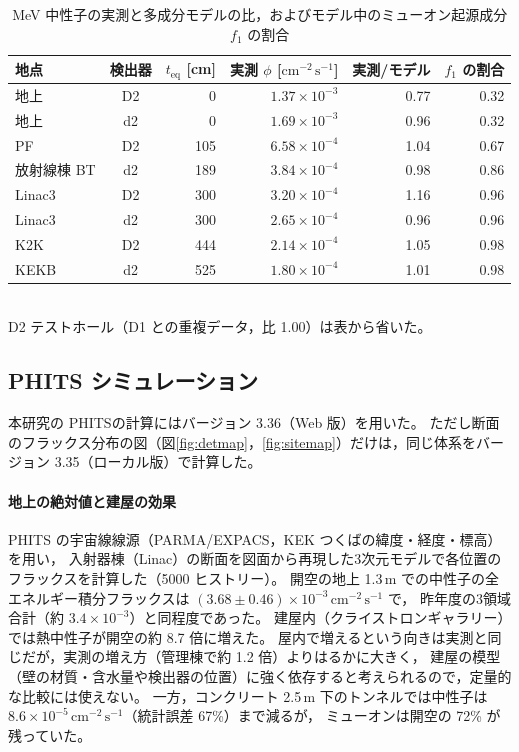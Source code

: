 \documentclass[a4paper,11pt]{ltjsarticle}
\newcommand{\teq}{t_{\mathrm{eq}}}
\newcommand{\flux}{\mathrm{cm^{-2}\,s^{-1}}}
\begin{document}
\begin{table}[htbp]
  \centering
  \caption{MeV 中性子の実測と多成分モデルの比，およびモデル中のミューオン起源成分 $f_1$ の割合}
  \label{tab:modelratio}
  \small
  \begin{tabular}{lcrrrr}
    \toprule
    地点 & 検出器 & $\teq$ [cm] & 実測 $\phi$ [$\flux$] & 実測/モデル & $f_1$ の割合 \\
    \midrule
    地上 & D2 & 0 & $1.37\times10^{-3}$ & 0.77 & 0.32 \\
    地上 & d2 & 0 & $1.69\times10^{-3}$ & 0.96 & 0.32 \\
    PF & D2 & 105 & $6.58\times10^{-4}$ & 1.04 & 0.67 \\
    放射線棟 BT & d2 & 189 & $3.84\times10^{-4}$ & 0.98 & 0.86 \\
    Linac3 & D2 & 300 & $3.20\times10^{-4}$ & 1.16 & 0.96 \\
    Linac3 & d2 & 300 & $2.65\times10^{-4}$ & 0.96 & 0.96 \\
    K2K & D2 & 444 & $2.14\times10^{-4}$ & 1.05 & 0.98 \\
    KEKB & d2 & 525 & $1.80\times10^{-4}$ & 1.01 & 0.98 \\
    \bottomrule
  \end{tabular}\\[2pt]
  \footnotesize D2 テストホール（D1 との重複データ，比 1.00）は表から省いた。
\end{table}

\subsection{PHITS シミュレーション}
\label{sec:phits}

本研究の PHITS\cite{PHITS}の計算にはバージョン 3.36（Web 版）を用いた。
ただし断面のフラックス分布の図（図\ref{fig:detmap}，\ref{fig:sitemap}）だけは，同じ体系をバージョン 3.35（ローカル版）で計算した。

\paragraph{地上の絶対値と建屋の効果}
PHITS の宇宙線線源（PARMA/EXPACS\cite{Sato2015}，KEK つくばの緯度・経度・標高）を用い，
入射器棟（Linac）の断面を図面から再現した3次元モデルで各位置のフラックスを計算した（5000 ヒストリー）。
開空の地上 1.3\,m での中性子の全エネルギー積分フラックスは $(3.68\pm0.46)\times10^{-3}\,\flux$ で，
昨年度の3領域合計（約 $3.4\times10^{-3}$）と同程度であった。
建屋内（クライストロンギャラリー）では熱中性子が開空の約 8.7 倍に増えた。
屋内で増えるという向きは実測と同じだが，実測の増え方（管理棟で約 1.2 倍）よりはるかに大きく，
建屋の模型（壁の材質・含水量や検出器の位置）に強く依存すると考えられるので，定量的な比較には使えない。
一方，コンクリート 2.5\,m 下のトンネルでは中性子は $8.6\times10^{-5}\,\flux$（統計誤差 67\%）まで減るが，
ミューオンは開空の 72\% が残っていた。
\end{document}
